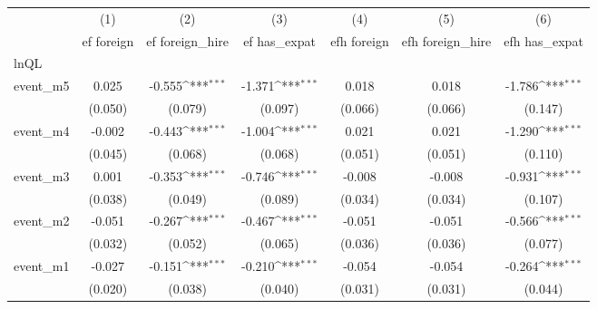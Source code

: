 {
\def\sym#1{\ifmmode^{#1}\else\(^{#1}\)\fi}
\begin{tabular}{l*{6}{c}}
\hline\hline
            &\multicolumn{1}{c}{(1)}&\multicolumn{1}{c}{(2)}&\multicolumn{1}{c}{(3)}&\multicolumn{1}{c}{(4)}&\multicolumn{1}{c}{(5)}&\multicolumn{1}{c}{(6)}\\
            &\multicolumn{1}{c}{ef foreign}&\multicolumn{1}{c}{ef foreign\_hire}&\multicolumn{1}{c}{ef has\_expat}&\multicolumn{1}{c}{efh foreign}&\multicolumn{1}{c}{efh foreign\_hire}&\multicolumn{1}{c}{efh has\_expat}\\
\hline
lnQL        &                     &                     &                     &                     &                     &                     \\
event\_m5    &       0.025         &      -0.555\sym{***}&      -1.371\sym{***}&       0.018         &       0.018         &      -1.786\sym{***}\\
            &     (0.050)         &     (0.079)         &     (0.097)         &     (0.066)         &     (0.066)         &     (0.147)         \\
[1em]
event\_m4    &      -0.002         &      -0.443\sym{***}&      -1.004\sym{***}&       0.021         &       0.021         &      -1.290\sym{***}\\
            &     (0.045)         &     (0.068)         &     (0.068)         &     (0.051)         &     (0.051)         &     (0.110)         \\
[1em]
event\_m3    &       0.001         &      -0.353\sym{***}&      -0.746\sym{***}&      -0.008         &      -0.008         &      -0.931\sym{***}\\
            &     (0.038)         &     (0.049)         &     (0.089)         &     (0.034)         &     (0.034)         &     (0.107)         \\
[1em]
event\_m2    &      -0.051         &      -0.267\sym{***}&      -0.467\sym{***}&      -0.051         &      -0.051         &      -0.566\sym{***}\\
            &     (0.032)         &     (0.052)         &     (0.065)         &     (0.036)         &     (0.036)         &     (0.077)         \\
[1em]
event\_m1    &      -0.027         &      -0.151\sym{***}&      -0.210\sym{***}&      -0.054         &      -0.054         &      -0.264\sym{***}\\
            &     (0.020)         &     (0.038)         &     (0.040)         &     (0.031)         &     (0.031)         &     (0.044)         \\

\end{tabular}}
